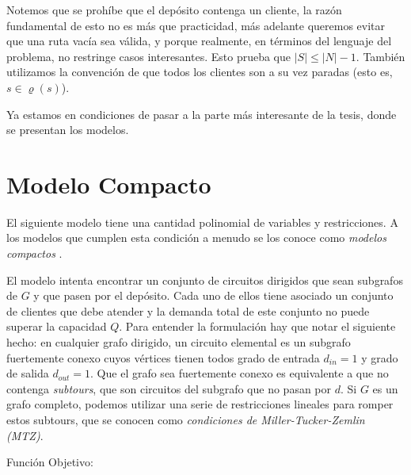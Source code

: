 Notemos que se prohíbe que el depósito contenga un cliente, la razón fundamental de esto no es más que practicidad, más adelante queremos evitar que una ruta vacía sea válida, y porque realmente, en términos del lenguaje del problema, no restringe casos interesantes. Esto prueba que $|S| \leq |N|-1$. También utilizamos la convención de que todos los clientes son a su vez paradas (esto es, $s \in \varrho(s)$). 

Ya estamos en condiciones de pasar a la parte más interesante de la tesis, donde se presentan los modelos.


\section{Modelo Compacto}
\label{section:compacto}

El siguiente modelo tiene una cantidad polinomial de variables y restricciones. A los modelos que cumplen esta condición a menudo se los conoce como \emph{modelos compactos} \cite[p.3]{lancia-serafini}. 

El modelo intenta encontrar un conjunto de circuitos dirigidos que sean subgrafos de $G$ y que pasen por el depósito. Cada uno de ellos tiene asociado un conjunto de clientes que debe atender y la demanda total de este conjunto no puede superar la capacidad $Q$. Para entender la formulación hay que notar el siguiente hecho: en cualquier grafo dirigido, un circuito elemental es un subgrafo fuertemente conexo cuyos vértices tienen todos grado de entrada $d_{in}=1$ y grado de salida $d_{out}=1$. Que el grafo sea fuertemente conexo es equivalente a que no contenga \emph{subtours}, que son circuitos del subgrafo que no pasan por $d$. Si $G$ es un grafo completo, podemos utilizar una serie de restricciones lineales para romper estos subtours, que se conocen como \emph{condiciones de Miller-Tucker-Zemlin (MTZ)}.  

Función Objetivo:

